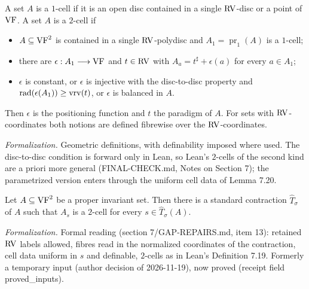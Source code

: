 \setcounter{theorem}{18}
\begin{definition}
\label{def-units}
\leanok
{}
A set $A$ is a $1$-cell if it is an open disc contained in a single $\mathrm{RV}$-disc or a point of $\mathrm{VF}$. A set $A$ is a $2$-cell if\begin{itemize}\item $A \subseteq \mathrm{VF}^2$ is contained in a single $\mathrm{RV}$-polydisc and $A_1 = \operatorname{pr}_1(A)$ is a $1$-cell;\item there are $\epsilon : A_1 \longrightarrow \mathrm{VF}$ and $t \in \mathrm{RV}$ with $A_a = t^\sharp + \epsilon(a)$ for every $a \in A_1$;\item $\epsilon$ is constant, or $\epsilon$ is injective with the disc-to-disc property and $\operatorname{rad}(\epsilon(A_1)) \geq \operatorname{vrv}(t)$, or $\epsilon$ is balanced in $A$.\end{itemize}Then $\epsilon$ is the positioning function and $t$ the paradigm of $A$. For sets with $\mathrm{RV}$-coordinates both notions are defined fibrewise over the $\mathrm{RV}$-coordinates.

\emph{Formalization.} Geometric definitions, with definability imposed where used. The disc-to-disc condition is forward only in Lean, so Lean's $2$-cells of the second kind are a priori more general (FINAL-CHECK.md, Notes on Section 7); the parametrized version enters through the uniform cell data of Lemma 7.20.
\end{definition}

\setcounter{theorem}{19}
\begin{lemma}
\label{decom-into-2-units}
\leanok
{}
Let $A \subseteq \mathrm{VF}^2$ be a proper invariant set. Then there is a standard contraction $\hat T_\sigma$ of $A$ such that $A_s$ is a $2$-cell for every $s \in \hat T_\sigma(A)$.

\emph{Formalization.} Formal reading (section 7/GAP-REPAIRS.md, item 13): retained $\mathrm{RV}$ labels allowed, fibres read in the normalized coordinates of the contraction, cell data uniform in $s$ and definable, $2$-cells as in Lean's Definition 7.19. Formerly a temporary input (author decision of 2026-11-19), now proved (receipt field proved\_inputs).
\end{lemma}

